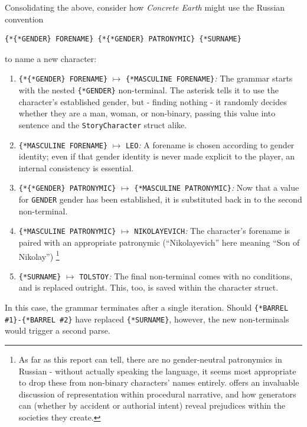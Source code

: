 \documentclass[a4paper, 11pt]{article}
\begin{document}
\begin{flushleft}
\vspace{5pt}\noindent
Consolidating the above, consider how \textit{Concrete Earth} might use the Russian convention
\begin{center}
\begin{BVerbatim}
{*{*GENDER} FORENAME} {*{*GENDER} PATRONYMIC} {*SURNAME}
\end{BVerbatim}
\end{center}
to name a new character:
\begin{enumerate}[label=\textit{\arabic*}\textit{.}, noitemsep]
\item \verb|{*{*GENDER} FORENAME}| $\mapsto$ \verb|{*MASCULINE FORENAME}|\textit{:} The grammar starts with the nested \verb|{*GENDER}| non-terminal. The asterisk tells it to use the character's established gender, but - finding nothing - it randomly decides whether they are a man, woman, or non-binary, passing this value into sentence and the \texttt{StoryCharacter} struct alike.
\item \verb|{*MASCULINE FORENAME}| $\mapsto$ \verb|LEO|\textit{:} A forename is chosen according to gender identity; even if that gender identity is never made explicit to the player, an internal consistency is essential.
\item \verb|{*{*GENDER} PATRONYMIC}| $\mapsto$ \verb|{*MASCULINE PATRONYMIC}|\textit{:} Now that a value for \verb|GENDER| gender has been established, it is substituted back in to the second non-terminal.
\item \verb|{*MASCULINE PATRONYMIC}| $\mapsto$ \verb|NIKOLAYEVICH|\textit{:} The character's forename is paired with an appropriate patronymic (``Nikolayevich'' here meaning ``Son of Nikolay'') \footnote{As far as this report can tell, there are no gender-neutral patronymics in Russian - without actually speaking the language, it seems most appropriate to drop these from non-binary characters' names entirely. \citet{cook19} offers an invaluable discussion of representation within procedural narrative, and how generators can (whether by accident or authorial intent) reveal prejudices within the societies they create.}
\item \verb|{*SURNAME}| $\mapsto$ \verb|TOLSTOY|\textit{:} The final non-terminal comes with no conditions, and is replaced outright. This, too, is saved within the character struct.
\end{enumerate}
In this case, the grammar terminates after a single iteration. Should \verb|{*BARREL #1}-{*BARREL #2}| have replaced \verb|{*SURNAME}|, however, the new non-terminals would trigger a second parse.


\end{flushleft}
\end{document}
